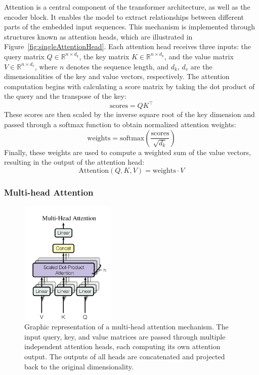 \documentclass{pracalicmgr}
\begin{document}
Attention is a central component of the transformer architecture, as well as the encoder block. It enables the model to extract relationships between different parts of the embedded input sequences. This mechanism is implemented through structures known as attention heads, which are illustrated in Figure~\ref{fig:singleAttentionHead}. Each attention head receives three inputs: the query matrix \( Q \in \mathbb{R}^{n \times d_k} \), the key matrix \( K \in \mathbb{R}^{n \times d_k} \), and the value matrix \( V \in \mathbb{R}^{n \times d_v} \), where \( n \) denotes the sequence length, and \( d_k \), \( d_v \) are the dimensionalities of the key and value vectors, respectively. The attention computation begins with calculating a score matrix by taking the dot product of the query and the transpose of the key: 
\[
\text{scores} = QK^\top
\]
These scores are then scaled by the inverse square root of the key dimension and passed through a softmax function to obtain normalized attention weights:
\[
\text{weights} = \text{softmax}\left(\frac{\text{scores}}{\sqrt{d_k}}\right)
\]
Finally, these weights are used to compute a weighted sum of the value vectors, resulting in the output of the attention head:
\[
\text{Attention}(Q, K, V) = \text{weights} \cdot V
\]

\subsubsection{Multi-head Attention}

\begin{figure}[h]
    \centering
    \includegraphics[width=0.4\textwidth]{src/multiHead.png}
    \caption{Graphic representation of a multi-head attention mechanism. The input query, key, and value matrices are passed through multiple independent attention heads, each computing its own attention output. The outputs of all heads are concatenated and projected back to the original dimensionality\cite{Vaswani2017Attention}.}
    \label{fig:multiHeadAttention}
\end{figure}
\end{document}
